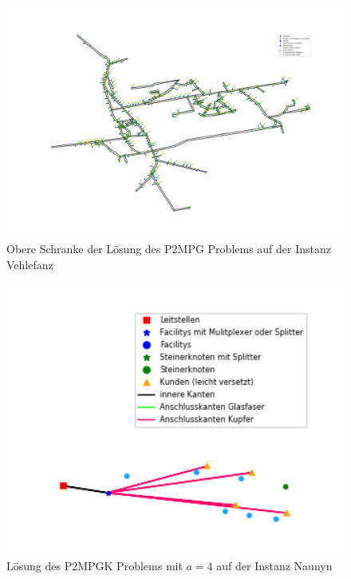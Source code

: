 \documentclass[11pt,a4paper]{article}
\theoremstyle{my_th_style1}
\begin{document}
\begin{figure}[!htbp]
	\begin{center}
		\begin{minipage}{15.0cm}
			\includegraphics[width=1\textwidth]{./Bilder/P2MPG_Vehlefanz_demand1_duration0_upperbound}
			\caption{Obere Schranke der L\"osung des P2MPG Problems auf der Instanz Vehlefanz}
			\label{p2mpg_v_pic_ub}
		\end{minipage}
	\end{center}
\end{figure}

\begin{figure}[!htbp]
	\begin{center}
		\begin{minipage}{15.0cm}
			\includegraphics[width=1\textwidth]{./Bilder/P2MPGK_Naunyn_demand1_duration0}
			\caption{L\"osung des P2MPGK Problems mit \(a = 4\) auf der Instanz Naunyn}
			\label{p2mpgk_n_pic_sn4}
		\end{minipage}
	\end{center}
\end{figure}
\end{document}
